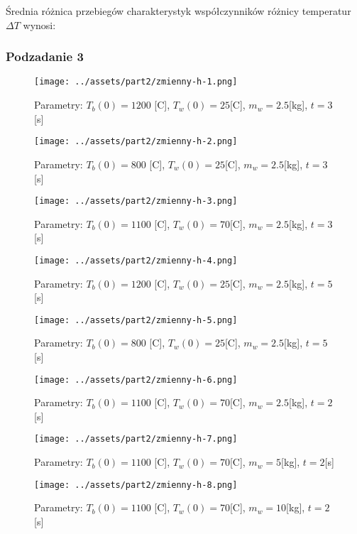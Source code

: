 \documentclass[
	12pt, %
]{fphw}
\begin{document}
Średnia różnica przebiegów charakterystyk współczynników
różnicy temperatur \(\Delta T\) wynosi:
%
{\csvcoli}%

\newpage

\subsubsection{Podzadanie 3}



\begin{figure}[H]
	\texttt{[image: ../assets/part2/zmienny-h-1.png]}
	\caption{Parametry: \(T_b(0) = 1200\) [\textdegree{}C], \(T_w(0) = 25\)[\textdegree{}C], \(m_w = 2.5\)[kg], \(t = 3\)[s]}

	\texttt{[image: ../assets/part2/zmienny-h-2.png]}
	\caption{Parametry: \(T_b(0) = 800\) [\textdegree{}C], \(T_w(0) = 25\)[\textdegree{}C], \(m_w = 2.5\)[kg], \(t = 3\)[s]}
\end{figure}


\begin{figure}[H]
	\texttt{[image: ../assets/part2/zmienny-h-3.png]}
	\caption{Parametry: \(T_b(0) = 1100\) [\textdegree{}C], \(T_w(0) = 70\)[\textdegree{}C], \(m_w = 2.5\)[kg], \(t = 3\)[s]}

	\texttt{[image: ../assets/part2/zmienny-h-4.png]}
	\caption{Parametry: \(T_b(0) = 1200\) [\textdegree{}C], \(T_w(0) = 25\)[\textdegree{}C], \(m_w = 2.5\)[kg], \(t = 5\)[s]}
\end{figure}

\begin{figure}[H]
	\texttt{[image: ../assets/part2/zmienny-h-5.png]}
	\caption{Parametry: \(T_b(0) = 800\) [\textdegree{}C], \(T_w(0) = 25\)[\textdegree{}C], \(m_w = 2.5\)[kg], \(t = 5\)[s]}

	\texttt{[image: ../assets/part2/zmienny-h-6.png]}
	\caption{Parametry: \(T_b(0) = 1100\) [\textdegree{}C], \(T_w(0) = 70\)[\textdegree{}C], \(m_w = 2.5\)[kg], \(t = 2\)[s]}
\end{figure}

\begin{figure}[H]
	\texttt{[image: ../assets/part2/zmienny-h-7.png]}
	\caption{Parametry: \(T_b(0) = 1100\) [\textdegree{}C], \(T_w(0) = 70\)[\textdegree{}C], \(m_w = 5\)[kg], \(t = 2\)[s]}

	\texttt{[image: ../assets/part2/zmienny-h-8.png]}
	\caption{Parametry: \(T_b(0) = 1100\) [\textdegree{}C], \(T_w(0) = 70\)[\textdegree{}C], \(m_w = 10\)[kg], \(t = 2\)[s]}
\end{figure}
\end{document}
